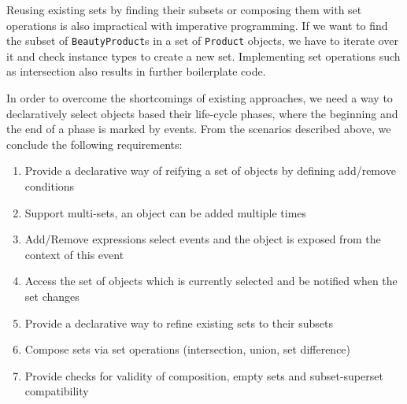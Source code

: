Reusing existing sets by finding their subsets or composing them with set operations is also impractical with imperative programming. If we want to find the subset of \texttt{BeautyProduct}s in a set of \texttt{Product} objects, we have to iterate over it and check instance types to create a new set. Implementing set operations such as intersection also results in further boilerplate code.

In order to overcome the shortcomings of existing approaches, we need a way to declaratively select objects based their life-cycle phases, where the beginning and the end of a phase is marked by events. From the scenarios described above, we conclude the following requirements:

\begin{enumerate}[{Requirement}1{:}]
\item Provide a declarative way of reifying a set of objects by defining add/remove conditions
\item Support multi-sets, an object can be added multiple times
\item Add/Remove expressions select events and the object is exposed from the context of this event
\item Access the set of objects which is currently selected and be notified when the set changes
\item Provide a declarative way to refine existing sets to their subsets
\item Compose sets via set operations (intersection, union, set difference)
\item Provide checks for validity of composition, empty sets and subset-superset compatibility
\end{enumerate}

